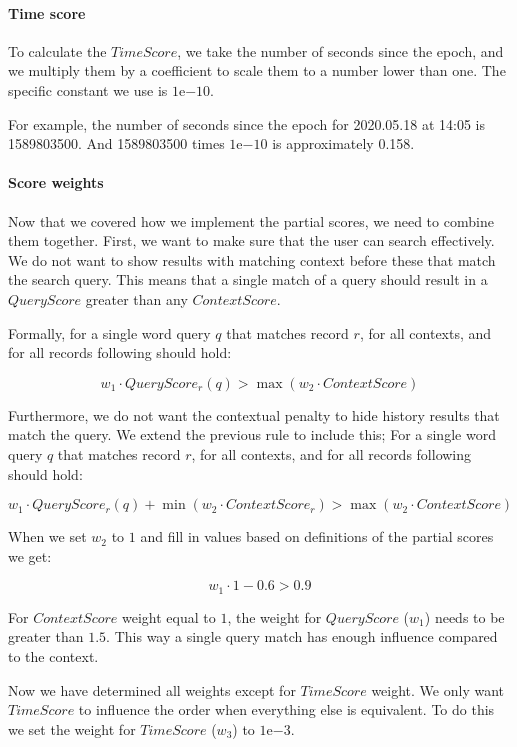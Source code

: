 \paragraph{Time score}


To calculate the \(TimeScore\), we take the number of seconds since the epoch, and we multiply them by a coefficient to scale them to a number lower than one. The specific constant we use is $1\mathrm{e}{-10}$.

For example, the number of seconds since the epoch for 2020.05.18 at 14:05 is 
1589803500. And 1589803500 times $1\mathrm{e}{-10}$ is approximately 0.158.


\paragraph{Score weights}


Now that we covered how we implement the partial scores, we need to combine them together.
First, we want to make sure that the user can search effectively. We do not want to show results with matching context before these that match the search query. This means that a single match of a query should result in a \(QueryScore\) greater than any \(ContextScore\).

Formally, for a single word query \(q\) that matches record \(r\), for all contexts, and for all records following should hold: 

\[ w_1 \cdot QueryScore_r(q) > \max{(w_2 \cdot ContextScore)} \]

Furthermore, we do not want the contextual penalty to hide history results that match the query. We extend the previous rule to include this; For a single word query \(q\) that matches record \(r\), for all contexts, and for all records following should hold:

\[ w_1 \cdot QueryScore_r(q) + \min{(w_2 \cdot ContextScore_r)} > \max{(w_2 \cdot ContextScore)} \]

When we set \(w_2\) to \(1\) and fill in values based on definitions of the partial scores we get:

\[ w_1 \cdot 1 - 0.6 > 0.9 \]

For \(ContextScore\) weight equal to \(1\), the weight for \(QueryScore\) (\(w_1\)) needs to be greater than \(1.5\). This way a single query match has enough influence compared to the context.

Now we have determined all weights except for \(TimeScore\) weight. We only want \(TimeScore\) to influence the order when everything else is equivalent. To do this we set the weight for \(TimeScore\) (\(w_3\)) to $1\mathrm{e}{-3}$.

